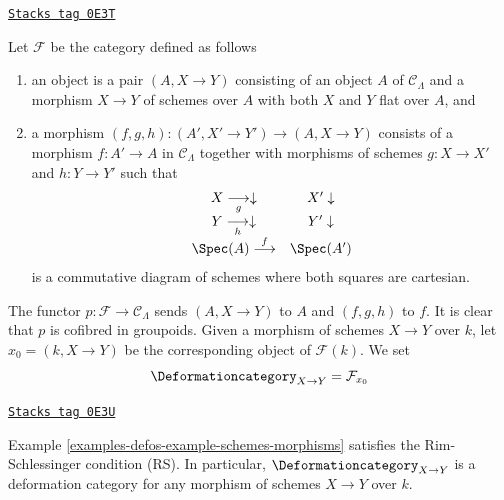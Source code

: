 \begin{example}

\label{examples-defos-example-schemes-morphisms}
\href{https://stacks.math.columbia.edu/tag/0E3T}{\texttt{Stacks tag 0E3T}}

Let $\mathcal{F}$ be the category defined as follows
\begin{enumerate}
\item an object is a pair $(A, X \to Y)$ consisting of an
object $A$ of $\mathcal{C}_\Lambda$ and a morphism
$X \to Y$ of schemes over $A$ with both $X$ and $Y$ flat over $A$, and
\item a morphism $(f, g, h) : (A', X' \to Y') \to (A, X \to Y)$ consists of
a morphism $f : A' \to A$ in $\mathcal{C}_\Lambda$ together
with morphisms of schemes $g : X \to X'$ and $h : Y \to Y'$ such that
$$
\begin{array}{cc}X \underset{g}{\longrightarrow}\downarrow & X' \downarrow \\ Y \underset{h}{\longrightarrow}\downarrow & Y' \downarrow \\ \Spec(A) \overset{f}{\longrightarrow} & \Spec(A')\end{array}
$$
is a commutative diagram of schemes where both squares are cartesian.
\end{enumerate}
The functor $p : \mathcal{F} \to \mathcal{C}_\Lambda$ sends $(A, X \to Y)$
to $A$ and $(f, g, h)$ to $f$. It is clear that $p$ is cofibred in groupoids.
Given a morphism of schemes $X \to Y$ over $k$, let $x_0 = (k, X \to Y)$
be the corresponding object of $\mathcal{F}(k)$. We set
$$
\Deformationcategory_{X \to Y} = \mathcal{F}_{x_0}
$$
\end{example}

\begin{lemma}
\label{examples-defos-lemma-schemes-morphisms-RS}
\href{https://stacks.math.columbia.edu/tag/0E3U}{\texttt{Stacks tag 0E3U}}

Example \ref{examples-defos-example-schemes-morphisms}
satisfies the Rim-Schlessinger condition (RS).
In particular, $\Deformationcategory_{X \to Y}$ is a deformation category
for any morphism of schemes $X \to Y$ over $k$.
\end{lemma}

